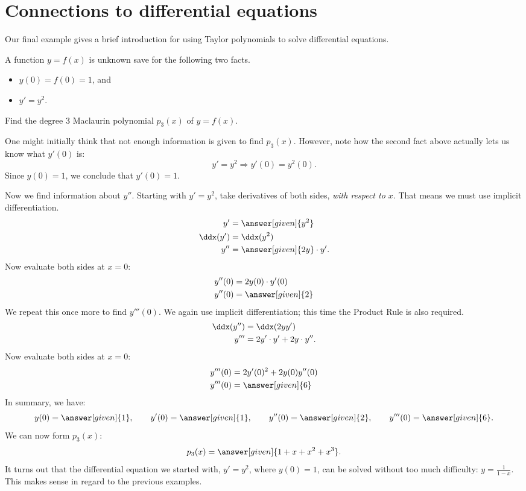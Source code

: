 \documentclass{ximera}
\begin{document}
\section{Connections to differential equations}

Our final example gives a brief introduction for using Taylor
polynomials to solve differential equations.

\begin{example}
  A function $y=f(x)$ is unknown save for the following two facts.
  \begin{itemize}
  \item	$y(0) = f(0) = 1$, and
  \item	$y'= y^2$.
  \end{itemize}
  Find the degree $3$ Maclaurin polynomial $p_3(x)$ of $y=f(x)$.
  \begin{explanation}
    One might initially think that not enough information is given to
    find $p_3(x)$. However, note how the second fact above actually
    lets us know what $y'(0)$ is:
    \[
    y' = y^2 \Rightarrow y'(0) = y^2(0).
    \]
    Since $y(0) = 1$, we conclude that $y'(0) = 1$.
    
    Now we find information about $y''$. Starting with $y'=y^2$, take
    derivatives of both sides, \emph{with respect to $x$}. That means
    we must use implicit differentiation.
    \begin{align*}
      y' &= \answer[given]{y^2}\\
      \ddx(y') &= \ddx(y^2)\\
      y'' &= \answer[given]{2y}\cdot y'.
    \end{align*}
    Now evaluate both sides at $x=0$:
    \begin{align*}
      y''(0) &= 2y(0)\cdot y'(0)\\
      y''(0) &= \answer[given]{2}
    \end{align*}
    We repeat this once more to find $y'''(0)$. We again use implicit
    differentiation; this time the Product Rule is also required.
    \begin{align*}
      \ddx(y'') &= \ddx (2yy')\\
      y''' &= 2y'\cdot y' + 2y\cdot y''.
    \end{align*}
    Now evaluate both sides at $x=0$:
    \begin{align*}
      y'''(0) &= 2y'(0)^2 + 2y(0)y''(0)\\
      y'''(0) &= \answer[given]{6}
    \end{align*}
    In summary, we have:
    \[
    y(0) = \answer[given]{1}, \qquad y'(0) = \answer[given]{1},  \qquad y''(0) = \answer[given]{2}, \qquad y'''(0) = \answer[given]{6}.
    \]
    We can now form $p_3(x)$:
    \[
      p_3(x) = \answer[given]{1+x+x^2+x^3}.
    \]
    It turns out that the differential equation we started with,
    $y'=y^2$, where $y(0)=1$, can be solved without too much
    difficulty: $y = \frac{1}{1-x}$. This makes sense in regard to
    the previous examples.
  \end{explanation}
\end{example}
\end{document}
